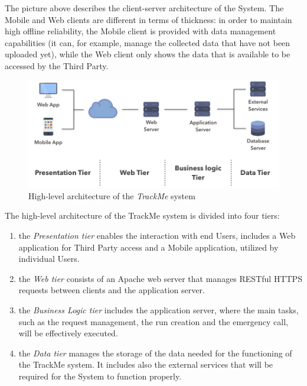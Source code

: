 \newpage

The picture above describes the client-server architecture of the System. The Mobile and Web clients are different in terms of thickness: in order to maintain high offline reliability, the Mobile client is provided with data management capabilities (it can, for example, manage the collected data that have not been uploaded yet), while the Web client only shows the data that is available to be accessed by the Third Party. 


\vspace{5mm}

\begin{figure}[H]

\includegraphics[scale=0.43,keepaspectratio]{./Pictures/high-level-basic.jpeg}
\centering
\caption{High-level architecture of the \textit{TrackMe} system}

\end{figure}

\vspace{5mm}

The high-level architecture of the TrackMe system is divided into four tiers:
\begin{enumerate}
\item the \textit{Presentation tier} enables the interaction with end Users, includes a Web application for Third Party access and a Mobile application, utilized by individual Users.
\item the \textit{Web tier} consists of an Apache web server that manages RESTful HTTPS requests between clients and the application server.
\item the \textit{Business Logic tier} includes the application server, where the main tasks, such as the request management, the run creation and the emergency call, will be effectively executed. 
\item the \textit{Data tier} manages the storage of the data needed for the functioning of the TrackMe system. It includes also the external services that will be required for the System to function properly.
\end{enumerate}

\newpage